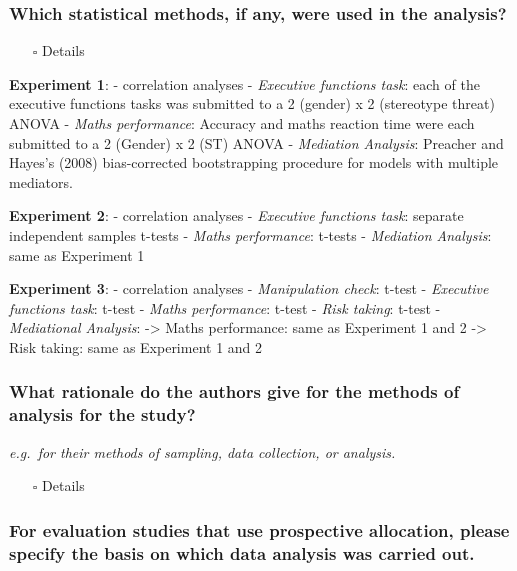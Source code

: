 \documentclass[
  doc, a4paper]{apa7}
\providecommand{\tightlist}{%
  \setlength{\itemsep}{0pt}\setlength{\parskip}{0pt}}
\begin{document}
\subsubsection{Which statistical methods, if any, were used in the analysis?}\label{which-statistical-methods-if-any-were-used-in-the-analysis}

\begin{itemize}
\tightlist
\item[$\square$]
  Details
\end{itemize}

\textbf{Experiment 1}:
- correlation analyses
- \emph{Executive functions task}: each of the executive functions tasks was submitted to a 2 (gender) x 2 (stereotype threat) ANOVA
- \emph{Maths performance}: Accuracy and maths reaction time were each submitted to a 2 (Gender) x 2 (ST) ANOVA
- \emph{Mediation Analysis}: Preacher and Hayes's (2008) bias-corrected bootstrapping procedure for models with multiple mediators.

\textbf{Experiment 2}:
- correlation analyses
- \emph{Executive functions task}: separate independent samples t-tests
- \emph{Maths performance}: t-tests
- \emph{Mediation Analysis}: same as Experiment 1

\textbf{Experiment 3}:
- correlation analyses
- \emph{Manipulation check}: t-test
- \emph{Executive functions task}: t-test
- \emph{Maths performance}: t-test
- \emph{Risk taking}: t-test
- \emph{Mediational Analysis}:
-\textgreater{} Maths performance: same as Experiment 1 and 2
-\textgreater{} Risk taking: same as Experiment 1 and 2

\subsubsection{What rationale do the authors give for the methods of analysis for the study?}\label{what-rationale-do-the-authors-give-for-the-methods-of-analysis-for-the-study}

\emph{e.g.~for their methods of sampling, data collection, or analysis.}

\begin{itemize}
\tightlist
\item[$\square$]
  Details
\end{itemize}

\subsubsection{For evaluation studies that use prospective allocation, please specify the basis on which data analysis was carried out.}\label{for-evaluation-studies-that-use-prospective-allocation-please-specify-the-basis-on-which-data-analysis-was-carried-out.}
\end{document}
